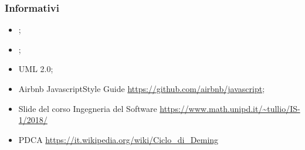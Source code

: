     \subsubsection{Informativi}
	    \begin{itemize}
	        \item \PdP;
	        \item \PdQ;
	        \item UML 2.0;
	        \item Airbnb Javascript\pedice Style Guide\newline
	        \url{https://github.com/airbnb/javascript};
            \item Slide del corso Ingegneria del Software \newline
            \url{https://www.math.unipd.it/~tullio/IS-1/2018/}
            \item PDCA\newline
            \url{https://it.wikipedia.org/wiki/Ciclo_di_Deming}
	    \end{itemize}

